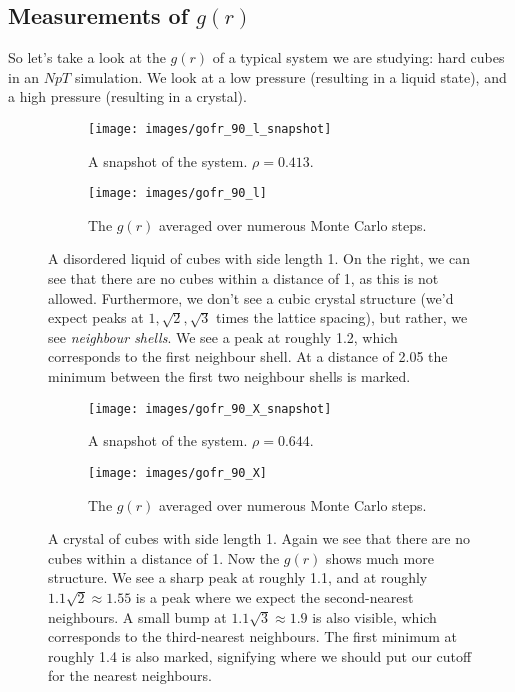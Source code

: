 \documentclass[thesis]{subfiles}
\begin{document}
\subsection{Measurements of \texorpdfstring{$g(r)$}{g(r)}}

So let's take a look at the $g(r)$ of a typical system we are studying: hard cubes in an $NpT$ simulation. We look at a low pressure (resulting in a liquid state), and a high pressure (resulting in a crystal).

\begin{figure}[h]
\begin{subfigure}{0.4\textwidth}
	\centering
	\vspace{8pt}
	\texttt{[image: images/gofr\_90\_l\_snapshot]}
	\vspace{10pt}
	\caption{A snapshot of the system. $\rho = 0.413$.}
\end{subfigure}
\begin{subfigure}{0.6\textwidth}
	\centering
	\texttt{[image: images/gofr\_90\_l]}
	\caption{The $g(r)$ averaged over numerous Monte Carlo steps.}
\end{subfigure}
\caption{A disordered liquid of cubes with side length 1. On the right, we can see that there are no cubes within a distance of 1, as this is not allowed. Furthermore, we don't see a cubic crystal structure (we'd expect peaks at $1, \sqrt 2, \sqrt 3$ times the lattice spacing), but rather, we see \emph{neighbour shells}. We see a peak at roughly 1.2, which corresponds to the first neighbour shell. At a distance of 2.05 the minimum between the first two neighbour shells is marked.}
\end{figure}

\begin{figure}[h]
	\begin{subfigure}{0.4\textwidth}
		\centering
		\texttt{[image: images/gofr\_90\_X\_snapshot]}
		\caption{A snapshot of the system. $\rho = 0.644$.}
	\end{subfigure}
	\begin{subfigure}{0.6\textwidth}
		\centering
		\texttt{[image: images/gofr\_90\_X]}
		\caption{The $g(r)$ averaged over numerous Monte Carlo steps.}
	\end{subfigure}
	\caption{A crystal of cubes with side length 1. Again we see that there are no cubes within a distance of 1. Now the $g(r)$ shows much more structure. We see a sharp peak at roughly 1.1, and at roughly $1.1 \sqrt 2 \approx 1.55$ is a peak where we expect the second-nearest neighbours. A small bump at $1.1 \sqrt 3 \approx 1.9$ is also visible, which corresponds to the third-nearest neighbours. The first minimum at roughly 1.4 is also marked, signifying where we should put our cutoff for the nearest neighbours.}
\end{figure}

\begin{comment}
\begin{minipage}{0.4\textwidth}
	\texttt{[image: images/gofr\_90\_l\_snapshot]}
\end{minipage}
\hfill
\begin{minipage}{0.6\textwidth}\raggedleft
	\texttt{[image: images/gofr\_90\_l]}
\end{minipage}
\end{comment}
\end{document}
